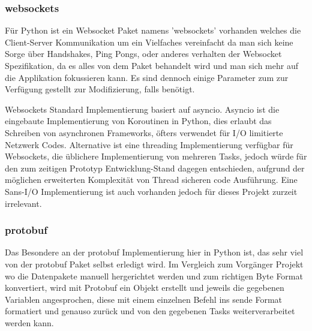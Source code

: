 \subsubsection{websockets}
Für Python ist ein Websocket Paket namens 'websockets' vorhanden 
welches die Client-Server Kommunikation um ein Vielfaches vereinfacht 
da man sich keine Sorge über Handshakes, Ping Pongs, 
oder anderes verhalten der Websocket Spezifikation, 
da es alles von dem Paket behandelt wird 
und man sich mehr auf die Applikation fokussieren kann. 
Es sind dennoch einige Parameter zum zur Verfügung gestellt zur Modifizierung, 
falls benötigt.

Websockets Standard Implementierung basiert auf asyncio.
%  
Asyncio ist die eingebaute Implementierung von Koroutinen in Python,
dies erlaubt das Schreiben von asynchronen Frameworks, 
öfters verwendet für I/O limitierte Netzwerk Codes.
Alternative ist eine threading Implementierung verfügbar für Websockets, 
die üblichere Implementierung von mehreren Tasks, 
jedoch würde für den zum zeitigen Prototyp Entwicklung-Stand dagegen entschieden,
aufgrund der möglichen erweiterten Komplexität von Thread sicheren code Ausführung.
Eine Sans-I/O Implementierung ist auch vorhanden 
jedoch für dieses Projekt zurzeit irrelevant.

\subsubsection{protobuf}
Das Besondere an der protobuf Implementierung hier in Python ist,
das sehr viel von der protobuf Paket selbst erledigt wird.
Im Vergleich zum Vorgänger Projekt wo die Datenpakete manuell hergerichtet werden
und zum richtigen Byte Format konvertiert, wird mit Protobuf ein Objekt erstellt 
und jeweils die gegebenen Variablen angesprochen, 
diese mit einem einzelnen Befehl ins sende Format formatiert und genauso zurück
und von den gegebenen Tasks weiterverarbeitet werden kann.


